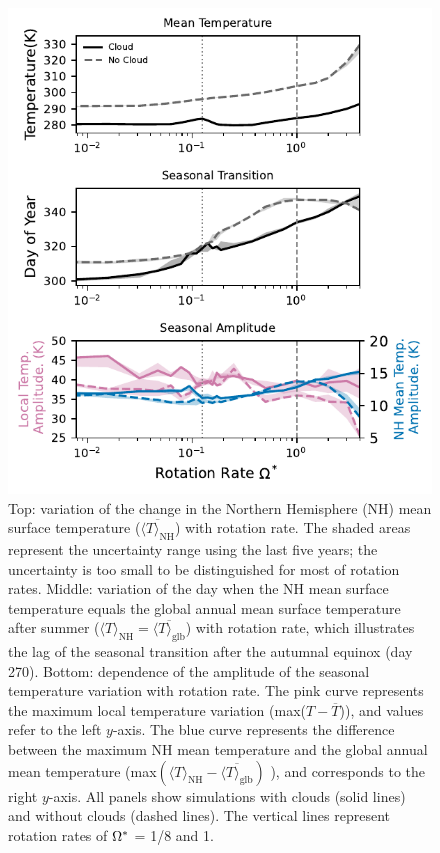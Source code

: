 \begin{figure}[tb]
   \centering
   \includegraphics[width=\columnwidth]{plots/8-Temp_rot_NH.pdf}
   \caption{Top: variation of the change in the Northern Hemisphere (NH) mean surface temperature ($\overline{\langle T\rangle_\textrm{NH}}$) with rotation rate. The shaded areas represent the uncertainty range using the last five years; the uncertainty is too small to be distinguished for most of rotation rates. Middle: variation of the day when the NH mean surface temperature equals the global annual mean surface temperature after summer ($\langle T\rangle_\textrm{NH}=\overline{\langle T\rangle_\textrm{glb}}$) with rotation rate, which illustrates the lag of the seasonal transition after the autumnal equinox (day 270). Bottom: dependence of the amplitude of the seasonal temperature variation with rotation rate. The pink curve represents the maximum local temperature variation (max($T-\overline{T}$)), and values refer to the left $y$-axis. The blue curve represents the difference between the maximum NH mean temperature and the global annual mean temperature  (max$\left(\langle T\rangle_\textrm{NH}-\overline{\langle T\rangle_\textrm{glb}}\right)$ ), and corresponds to the right $y$-axis. All panels show simulations with clouds (solid lines) and without clouds (dashed lines). The vertical lines represent rotation rates of $\Omega^*$ = 1/8 and 1.}
   \label{fig:Seasonal_Transition}
\end{figure}

